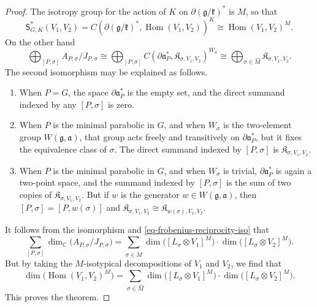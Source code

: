 \documentclass[leqno,11pt]{amsart}
\numberwithin{equation}{subsection}
\theoremstyle{plain}
\theoremstyle{definition}
\theoremstyle{remark}
\newcommand{\Compact}{\mathfrak{K}}
\newcommand{\C}{\mathbb{C}}
\newcommand{\Symb}{\mathsf{S}}
\DeclareMathOperator{\Hom}{Hom}
\begin{document}
\begin{proof}
The isotropy group for the action of $K$ on $\partial (\mathfrak{g}/\mathfrak{k})^*$ is $M$, so that 
\[
\Symb^{*}_{G,K}(V_1, V_2)  = C(\partial (\mathfrak{g}/\mathfrak{k})^*, \Hom (V_1,V_2))^K \cong \Hom (V_1,V_2)^M. 
\]
On the other hand 
\begin{equation*}
\bigoplus _{[P,\sigma]} A_{P,\sigma}/J_{P,\sigma} \cong \bigoplus _{[P,\sigma]} C (\partial{\mathfrak{a}^*_P},   \Compact _{\sigma, V_1,V_2}  )^{W_\sigma}  
\cong 
 \bigoplus _{\sigma \in \widehat M} 
\Compact _{\sigma, V_1,V_2}.
\end{equation*}
The second isomorphism may be explained as follows.
\begin{enumerate}[\rm (i)]

\item When $P{=}G$, the space $\partial{\mathfrak{a}^*_P}$ is the empty set, and the  direct summand indexed by any $[P,\sigma]$ is zero.

\item When $P$ is the minimal parabolic in $G$, and when $W_\sigma$ is the two-element group $W(\mathfrak{g},\mathfrak{a})$, that group acts freely and transitively on $\partial{\mathfrak{a}^*_P}$, but it fixes the equivalence class of $\sigma$. The direct summand indexed by $[P,\sigma]$ is  $ \Compact _{\sigma, V_1,V_2}$. 

\item When $P$ is the minimal parabolic in $G$, and when $W_\sigma$ is   trivial, $\partial{\mathfrak{a}^*_P}$ is again a two-point space,  and the  summand indexed by $[P,\sigma]$ is the  sum of two copies of  $\Compact _{\sigma, V_1,V_2}$.  But if $w$ is the generator $w\in W(\mathfrak{g},\mathfrak{a})$, then  $[P,\sigma]= [P,w(\sigma)]$ and $ \Compact _{\sigma, V_1,V_2}\cong  \Compact _{w(\sigma), V_1,V_2}$.

\end{enumerate}
It follows from the isomorphism and   \eqref{eq-frobenius-reciprocity-iso} that 
\begin{equation*}
\sum_{[P,\sigma]} \dim_{\C} \bigl (  A_{P,
\sigma}/J_{P,\sigma} \bigr )
= 
\sum_{\sigma \in \widehat M}
\dim \bigl ( [ L_{\sigma} \otimes V_1  ]^M \bigr )\cdot \dim \bigl ( [ L_{\sigma} \otimes V_2  ]^M \bigr ) .
\end{equation*}
But by taking  the $M$-isotypical decompositions of $V_1$ and $V_2$, we find that 
\[
\dim \bigl ( \Hom(V_1,V_2)^M \bigr ) =\sum_{\sigma \in \widehat M}
\dim \bigl ( [ L_{\sigma} \otimes V_1  ]^M \bigr )\cdot \dim \bigl ( [ L_{\sigma} \otimes V_2  ]^M \bigr ).  
\]
This proves the theorem. 
\end{proof}
\end{document}
